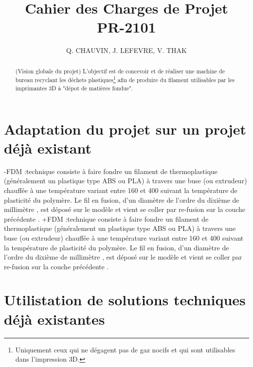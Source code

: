 \documentclass[a4paper,11pt]{article}
\title{Cahier des Charges de Projet\\PR-2101}
\author{Q. CHAUVIN, J. LEFEVRE, V. THAK}
\begin{document}
 
 \maketitle
 
 \begin{abstract}
 (Vision globale du projet)
 L'objectif est de concevoir et de réaliser une machine de bureau recyclant les déchets plastiques\footnote{Uniquement ceux qui ne dégagent pas de gaz nocifs et qui sont utilisables dans l'impression 3D.} afin de produire du filament utilisables par les imprimantes 3D à "dépot de matières fondue". 
 \end{abstract}
 
 \section{Adaptation du projet sur un projet déjà existant}
 
-FDM :technique consiste à faire fondre un filament de thermoplastique (généralement un plastique type ABS ou PLA) à travers une buse (ou extrudeur) chauffée à une température variant entre 160 et 400  suivant la température de plasticité du polymère. Le fil en fusion, d'un diamètre de l'ordre du dixième de millimètre , est déposé sur le modèle et vient se coller par re-fusion sur la couche précédente .
+FDM :technique consiste à faire fondre un filament de thermoplastique (généralement un plastique type ABS ou PLA) à travers une buse (ou extrudeur) chauffée à une température variant entre 160 et 400 suivant la température de plasticité du polymère. Le fil en fusion, d'un diamètre de l'ordre du dixième de millimètre , est déposé sur le modèle et vient se coller par re-fusion sur la couche précédente .
 
 \section{Utilistation de solutions techniques déjà existantes}
\end{document}
